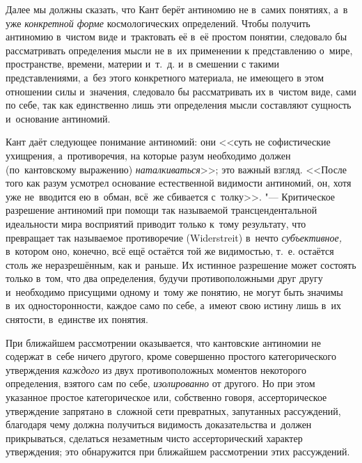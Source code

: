 Далее мы должны сказать, что Кант берёт антиномию не в~самих понятиях, а~в
уже {\em конкретной форме} космологических определений.
Чтобы получить антиномию в~чистом виде и~трактовать её в~её простом
понятии, следовало бы рассматривать определения мысли не в~их применении к
представлению о~мире, пространстве, времени, материи и~т.~д. и~в смешении с
такими представлениями, а~без этого конкретного материала, не имеющего в
этом отношении силы и~значения, следовало бы рассматривать их в~чистом
виде, сами по себе, так как единственно лишь эти определения мысли
составляют сущность и~основание антиномий.

Кант даёт следующее понимание антиномий: они <<суть не софистические
ухищрения, а~противоречия, на которые разум необходимо должен (по~кантовскому
выражению) {\em наталкиваться}>>; это важный взгляд. <<После того как
разум усмотрел основание естественной видимости антиномий, он, хотя уже
не~вводится ею в~обман, всё~же сбивается с~толку>>. "--- Критическое разрешение антиномий при помощи так
называемой трансцендентальной идеальности мира восприятий приводит только
к~тому результату, что превращает так называемое противоречие (Wider\-streit)
в~нечто {\em субъективное,} в~котором оно, конечно, всё ещё остаётся той же
видимостью, т.~е. остаётся столь же неразрешённым, как и~раньше. Их истинное
разрешение может состоять только в~том, что два определения, будучи
противоположными друг другу и~необходимо присущими одному и~тому же понятию, не
могут быть значимы в~их односторонности, каждое само по себе, а~имеют свою
истину лишь в~их снятости, в~единстве их понятия.

При ближайшем рассмотрении оказывается, что кантовские антиномии не содержат
в~себе ничего другого, кроме совершенно простого категорического
утверждения {\em каждого} из двух противоположных
моментов некоторого определения, взятого сам по себе,
{\em изолированно} от другого. Но при этом указанное
простое категорическое или, собственно говоря, ассерторическое утверждение
запрятано в~сложной сети превратных, запутанных рассуждений, благодаря чему
должна получиться видимость доказательства и~должен прикрываться, сделаться
незаметным чисто ассерторический характер утверждения; это обнаружится при
ближайшем рассмотрении этих рассуждений.

